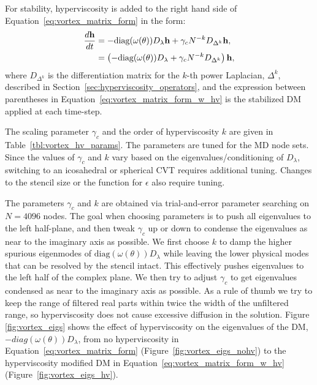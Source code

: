 \documentclass{report}
\begin{document}
For stability, hyperviscosity is added to the right hand side of Equation~\ref{eq:vortex_matrix_form} in the form: 
\begin{align}
\frac{d \mathbf{h}}{d t} & = - \text{diag}(\omega(\theta)) D_\lambda \mathbf{h} + \gamma_c N^{-k} D_{\Delta^{k}} \mathbf{h}, \nonumber \\
 & = \left(- \text{diag}(\omega(\theta)) D_\lambda + \gamma_c N^{-k} D_{\Delta^{k}}\right) \mathbf{h}, 
\label{eq:vortex_matrix_form_w_hv}
\end{align}
where $D_{\Delta^{k}}$ is the differentiation matrix for the $k$-th power Laplacian, $\Delta^{k}$, described in Section~\ref{sec:hyperviscosity_operators}, and the expression between parentheses in Equation~\ref{eq:vortex_matrix_form_w_hv} is the stabilized DM applied at each time-step. 

The scaling parameter $\gamma_c$ and the order of hyperviscosity $k$ are given in
Table~\ref{tbl:vortex_hv_params}. The parameters are tuned for the MD node sets. Since the values of $\gamma_c$ and $k$ vary based on the eigenvalues/conditioning of $D_\lambda$, switching to an icosahedral or spherical CVT requires additional tuning. Changes to the stencil size or the function for $\epsilon$ also require tuning. 

The parameters $\gamma_c$ and $k$ are obtained via trial-and-error parameter searching on $N=4096$ nodes. The goal when choosing parameters is to push all eigenvalues to the left half-plane, and then tweak $\gamma_c$ up or down to condense the eigenvalues as near to the imaginary axis as possible. We first choose $k$ to damp the higher spurious eigenmodes of $\text{diag}(\omega(\theta)) D_\lambda$ while leaving the lower physical modes that can be resolved by the stencil intact. This effectively pushes eigenvalues to the left half of the complex plane.  We then try to adjust $\gamma_c$ to get eigenvalues condensed as near to the imaginary axis as possible. As a rule of thumb we try to keep the range of filtered real parts within twice the width of the unfiltered range, so hyperviscosity does not cause excessive diffusion in the solution. Figure \ref{fig:vortex_eigs} shows the effect of hyperviscosity on the eigenvalues of the DM, $-diag(\omega(\theta)) D_\lambda$, from no hyperviscosity in Equation~\ref{eq:vortex_matrix_form} (Figure~\ref{fig:vortex_eigs_nohv}) to the hyperviscosity modified DM in Equation~\ref{eq:vortex_matrix_form_w_hv} (Figure~\ref{fig:vortex_eigs_hv}). 
\end{document}
